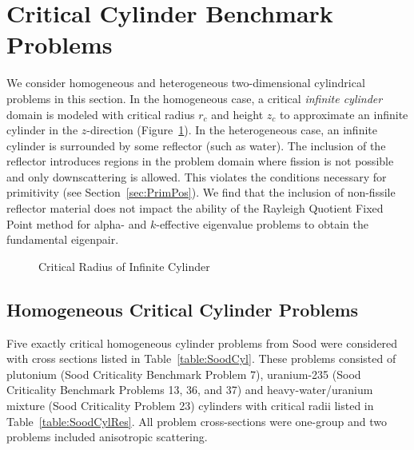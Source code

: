 \section{Critical Cylinder Benchmark Problems}

We consider homogeneous and heterogeneous two-dimensional cylindrical problems in this section. In the homogeneous case, a critical \textit{infinite cylinder} domain is modeled with critical radius $r_{c}$ and height $z_{c}$ to approximate an infinite cylinder in the $z$-direction (Figure~\ref{fig:CylCritRadius}). In the heterogeneous case, an infinite cylinder is surrounded by some reflector (such as water). The inclusion of the reflector introduces regions in the problem domain where fission is not possible and only downscattering is allowed. This violates the conditions necessary for primitivity (see Section~\ref{sec:PrimPos}). We find that the inclusion of non-fissile reflector material does not impact the ability of the Rayleigh Quotient Fixed Point method for alpha- and $k$-effective eigenvalue problems to obtain the fundamental eigenpair.

\begin{figure}[!htbp]
	\centering
	
	\caption{Critical Radius of Infinite Cylinder}
	\label{fig:CylCritRadius}
\end{figure}

\subsection{Homogeneous Critical Cylinder Problems}

Five exactly critical homogeneous cylinder problems from Sood \cite{sood2003analytical} were considered with cross sections listed in Table~\ref{table:SoodCyl}. These problems consisted of plutonium (Sood Criticality Benchmark Problem 7), uranium-235 (Sood Criticality Benchmark Problems 13, 36, and 37) and heavy-water/uranium mixture (Sood Criticality Problem 23) cylinders with critical radii listed in Table~\ref{table:SoodCylRes}. All problem cross-sections were one-group and two problems included anisotropic scattering.

